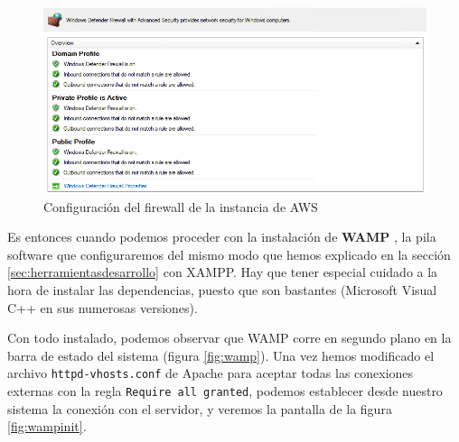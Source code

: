 \begin{figure}
	\centering
	\includegraphics[width=\linewidth]{img/firewall}
	\caption{Configuración del firewall de la instancia de AWS}
	\label{fig:firewall}
\end{figure}

Es entonces cuando podemos proceder con la instalación de \textbf{WAMP} \cite{wamp}, la pila software que configuraremos del mismo modo que hemos explicado en la sección \ref{sec:herramientasdesarrollo} con XAMPP. Hay que tener especial cuidado a la hora de instalar las dependencias, puesto que son bastantes (Microsoft Visual C++ en sus numerosas versiones).

Con todo instalado, podemos observar que WAMP corre en segundo plano en la barra de estado del sistema (figura \ref{fig:wamp}). Una vez hemos modificado el archivo \texttt{httpd-vhosts.conf} de Apache para aceptar todas las conexiones externas con la regla \texttt{Require all granted}, podemos establecer desde nuestro sistema la conexión con el servidor, y veremos la pantalla de la figura \ref{fig:wampinit}.

